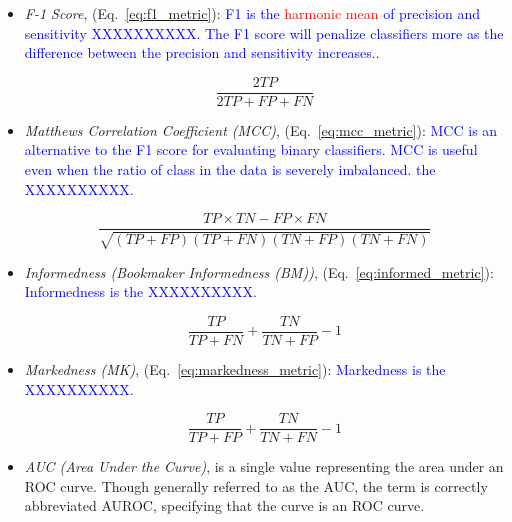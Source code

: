 \begin{itemize}
\item \textit{F-1 Score}, (Eq.~\ref{eq:f1_metric}): \textcolor{blue}{F1 is the \textcolor{red}{harmonic mean} of precision and sensitivity XXXXXXXXXX. The F1 score will penalize classifiers more as the difference between the precision and sensitivity increases.}.

\begin{equation}
{\frac{2TP}{2TP+FP+FN}}
\label{eq:f1_metric}
\end{equation}

\item \textit{Matthews Correlation Coefficient (MCC)}, (Eq.~\ref{eq:mcc_metric}): \textcolor{blue}{MCC is  an alternative to the F1 score for evaluating binary classifiers. MCC is useful even when the ratio of class in the data is severely imbalanced. the XXXXXXXXXX}.

\begin{equation}
{\frac{TP \times TN - FP \times FN}{\sqrt{(TP + FP)(TP + FN)(TN + FP)(TN + FN)}}}
\label{eq:mcc_metric}
\end{equation}

\item \textit{Informedness (Bookmaker Informedness (BM))}, (Eq.~\ref{eq:informed_metric}): \textcolor{blue}{Informedness is the XXXXXXXXXX}.

\begin{equation}
{\frac{TP}{TP+FN}+\frac{TN}{TN+FP}-1}
\label{eq:informed_metric}
\end{equation}

\item \textit{Markedness (MK)}, (Eq.~\ref{eq:markedness_metric}): \textcolor{blue}{Markedness is the XXXXXXXXXX}.

\begin{equation}
{\frac{TP}{TP+FP}+\frac{TN}{TN+FN}-1}
\label{eq:markedness_metric}
\end{equation}



\item \textit{AUC (Area Under the Curve)}, is a single value representing the area under an ROC curve. Though generally referred to as the AUC, the term is correctly abbreviated AUROC, specifying that the curve is an ROC curve.
\end{itemize}

